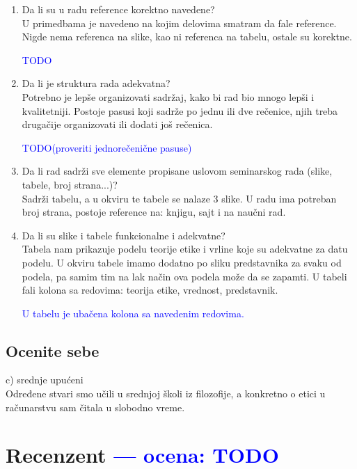 \documentclass[a4paper]{report}
\newcommand{\odgovor}[1]{\textcolor{blue}{#1}}
\begin{document}
\begin{enumerate}
\item Da li su u radu reference korektno navedene?\\
U primedbama je navedeno na kojim delovima smatram da fale reference. Nigde nema referenca na slike, kao ni referenca na tabelu, ostale su korektne.

\odgovor{TODO}

\item Da li je struktura rada adekvatna?\\
Potrebno je lepše organizovati sadržaj, kako bi rad bio mnogo lepši i kvalitetniji. Postoje pasusi koji sadrže po jednu ili dve rečenice, njih treba drugačije organizovati ili dodati još rečenica.

\odgovor{TODO(proveriti jednorečenične pasuse)}

\item Da li rad sadrži sve elemente propisane uslovom seminarskog rada (slike, tabele, broj strana...)?\\ Sadrži tabelu, a u okviru te tabele se nalaze 3 slike. U radu ima potreban broj strana, postoje reference na: knjigu, sajt i na naučni rad.

\item Da li su slike i tabele funkcionalne i adekvatne?\\ Tabela nam prikazuje podelu teorije etike i vrline koje su adekvatne za datu podelu. U okviru tabele imamo dodatno po sliku predstavnika za svaku od podela, pa samim tim na lak način ova podela može da se zapamti. U tabeli fali kolona sa redovima: teorija etike, vrednost, predstavnik.

\odgovor{U tabelu je ubačena kolona sa navedenim redovima.}

\end{enumerate}

\section{Ocenite sebe}
c) srednje upućeni
  \\ Određene stvari smo učili u srednjoj školi iz filozofije, a konkretno o etici u računarstvu sam čitala u slobodno vreme.

\chapter{Recenzent \odgovor{--- ocena: TODO} }
\end{document}

